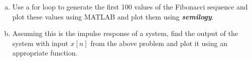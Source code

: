 \documentclass[11pt]{article}
\begin{document}
\begin{enumerate}[a.]
    \item Use a for loop to generate the first 100 values of the Fibonacci sequence and plot these values
    using MATLAB and plot them using \textit{\textbf{semilogy}}.

    \item Assuming this is the impulse response of a system,
    find the output of the system with input $x[n]$ from the above problem and
    plot it using an appropriate function.
\end{enumerate}
\end{document}
